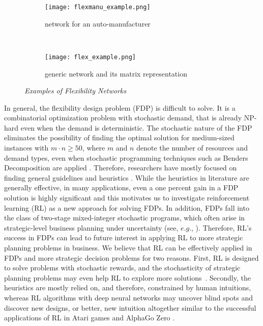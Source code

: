 \documentclass{article} %
\begin{document}
\begin{figure}[t!]
\centering
 \begin{subfigure}[t]{0.4\textwidth}
 \centering
 \texttt{[image: flexmanu\_example.png]}
   \caption {network for an auto-manufacturer}\label{fig:flex_auto}
 \end{subfigure}
 ~
 \begin{subfigure}[t]{0.5\textwidth}
  \centering
  \texttt{[image: flex\_example.png]}
     \caption {generic network and its matrix representation}\label{fig:flex_general} 
 \end{subfigure}
\caption {\textit{Examples of Flexibility Networks}  \label{fig:flex_examples}}
\vspace{-6mm}
\end{figure}

In general, the flexibility design problem (FDP) is difficult to solve. It is a combinatorial optimization problem with stochastic demand, that is already NP-hard even when the demand is deterministic. The stochastic nature of the FDP eliminates the possibility of finding the optimal solution for medium-sized instances with $m \cdot n\geq 50$, where $m$ and $n$ denote the number of resources and demand types, even when stochastic programming techniques such as Benders Decomposition are applied \citep{feng2017process}. Therefore, researchers have mostly focused on finding general guidelines and heuristics \citep{JG95, Chou2010, SimchiLeviWei, feng2017process}. While the heuristics in literature are generally effective, in many applications, even a one percent gain in a FDP solution is highly significant \citep{JG95, Chou2010, feng2017process} and this motivates us to investigate reinforcement learning (RL) as a new approach for solving FDPs. In addition, FDPs fall into the class of two-stage mixed-integer stochastic programs, which often arise in strategic-level business planning under uncertainty (see, $e.g.$, \citet{santoso2005stochastic}). Therefore, RL's success in FDPs can lead to future interest in applying RL to more strategic planning problems in business. We believe that RL can be effectively applied in FDPs and more strategic decision problems for two reasons. First, RL is designed to solve problems with stochastic rewards, and the stochasticity of strategic planning problems may even help RL to explore more solutions~\citep{sutton2000policy}. Secondly, the heuristics are mostly relied on, and therefore, constrained by human intuitions, whereas RL algorithms with deep neural networks may uncover blind spots and discover new designs, or better, new intuition altogether similar to the successful applications of RL in Atari games and AlphaGo Zero \citep{silver2017mastering}.
\end{document}
